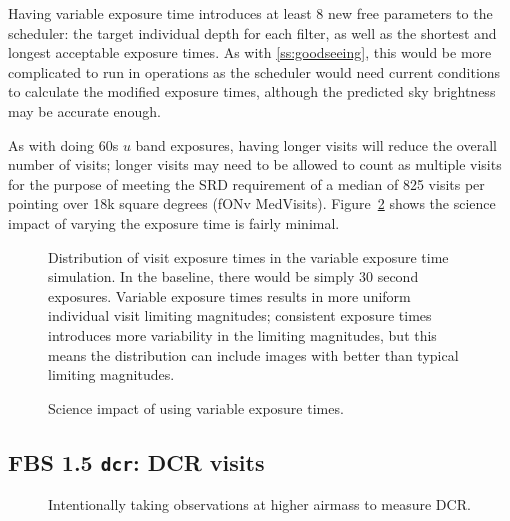 Having variable exposure time introduces at least 8 new free parameters to the scheduler: the target individual depth for each filter, as well as the shortest and longest acceptable exposure times.  As with \ref{ss:goodseeing}, this would be more complicated to run in operations as the scheduler would need current conditions to calculate the modified exposure times, although the predicted sky brightness may be accurate enough.

As with doing 60s $u$ band exposures, having longer visits will reduce the overall number of visits; longer visits may need to be allowed to count as multiple visits for the purpose of meeting the SRD requirement of a median of 825 visits per pointing over 18k square degrees (fONv MedVisits).  Figure~\ref{fig:var_radar} shows the science impact of varying the exposure time is fairly minimal. 

\begin{figure}
\caption{Distribution of visit exposure times in the variable exposure time simulation. In the baseline, there would be simply 30 second exposures. Variable exposure times results in more uniform individual visit limiting magnitudes; consistent exposure times introduces more variability in the limiting magnitudes, but this means the distribution can include images with better than typical limiting magnitudes.}
\label{fig:varexpt_exptime}
\end{figure}

\begin{figure}
\caption{Science impact of using variable exposure times.}\label{fig:var_radar}
\end{figure}


\subsection{FBS 1.5 {\tt dcr}: DCR visits}

\begin{figure}
\caption{Intentionally taking observations at higher airmass to measure DCR.}
\end{figure}

